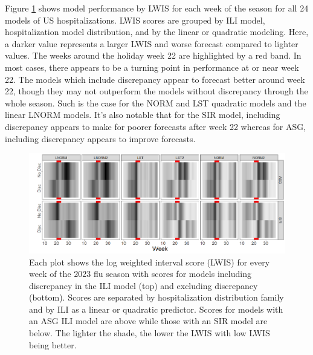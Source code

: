 \documentclass[ba]{imsart}
\theoremstyle{plain}
\theoremstyle{definition}
\theoremstyle{remark}
\begin{document}
Figure \ref{fig:us_lwis} shows model performance by LWIS for each week of the season for all 24 models of US hospitalizations. LWIS scores are grouped by ILI model, hospitalization model distribution, and by the linear or quadratic modeling. Here, a darker value represents a larger LWIS and worse forecast compared to lighter values. The weeks around the holiday week 22 are highlighted by a red band. In most cases, there appears to be a turning point in performance at or near week 22. The models which include discrepancy appear to forecast better around week 22, though they may not outperform the models without discrepancy through the whole season. 
Such is the case for the NORM and LST quadratic models and the linear LNORM models. It's also notable that for the SIR model, including discrepancy appears to make for poorer forecasts after week 22 whereas for ASG, including discrepancy appears to improve forecasts.



\begin{figure}
    
    \includegraphics[scale = .5]{Images/lwis_us_full_season.png}
    \caption{Each plot shows the log weighted interval score (LWIS) for every week of the 2023 flu season with scores for models including discrepancy in the ILI model (top) and excluding discrepancy (bottom). Scores are separated by hospitalization distribution family and by ILI as a linear or quadratic predictor. Scores for models with an ASG ILI model are above while those with an SIR model are below. The lighter the shade, the lower the LWIS with low LWIS being better.}
    \label{fig:us_lwis}
\end{figure}

 
\end{document}
